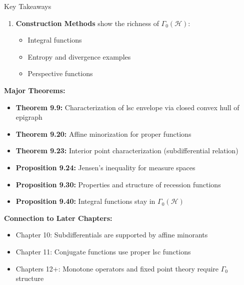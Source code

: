\documentclass[aspectratio=169,10pt]{beamer}
\begin{document}
\begin{frame}[allowframebreaks]{Key Takeaways}
\begin{enumerate}
    \item \textbf{Construction Methods} show the richness of $\Gamma_0(\mathcal{H})$:
        \begin{itemize}
            \item Integral functions
            \item Entropy and divergence examples
            \item Perspective functions
        \end{itemize}
\end{enumerate}

\framebreak

\textbf{Major Theorems:}

\vspace{0.2cm}
\begin{itemize}
    \item \textbf{Theorem 9.9:} Characterization of lsc envelope via closed convex hull of epigraph
    \item \textbf{Theorem 9.20:} Affine minorization for proper functions
    \item \textbf{Theorem 9.23:} Interior point characterization (subdifferential relation)
    \item \textbf{Proposition 9.24:} Jensen's inequality for measure spaces
    \item \textbf{Proposition 9.30:} Properties and structure of recession functions
    \item \textbf{Proposition 9.40:} Integral functions stay in $\Gamma_0(\mathcal{H})$
\end{itemize}

\vspace{0.3cm}
\textbf{Connection to Later Chapters:}

\begin{itemize}
    \item Chapter 10: Subdifferentials are supported by affine minorants
    \item Chapter 11: Conjugate functions use proper lsc functions
    \item Chapters 12+: Monotone operators and fixed point theory require $\Gamma_0$ structure
\end{itemize}
\end{frame}
\end{document}
